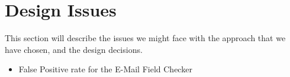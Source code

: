 \section[Issues]{Design Issues}

This section will describe the issues we might face with the approach that we have chosen, and the design decisions.

\begin{itemize}
	\item \label{issues:fpr}False Positive rate for the E-Mail Field Checker
\end{itemize}